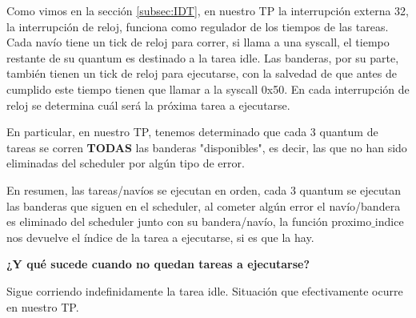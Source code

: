 \par{Como vimos en la sección \ref{subsec:IDT}, en nuestro TP la interrupción externa 32, la interrupción de reloj, funciona como regulador de los tiempos de las tareas. Cada navío tiene un tick de reloj para correr, si llama a una syscall, el tiempo restante de su quantum es destinado a la tarea idle. Las banderas, por su parte, también tienen un tick de reloj para ejecutarse, con la salvedad de que antes de cumplido este tiempo tienen que llamar a la syscall 0x50. En cada interrupción de reloj se determina cuál será la próxima tarea a ejecutarse.}
\par{En particular, en nuestro TP, tenemos determinado que cada 3 quantum de tareas se corren \textbf{TODAS} las banderas "disponibles", es decir, las que no han sido eliminadas del scheduler por algún tipo de error.}
\par{En resumen, las tareas/navíos se ejecutan en orden, cada 3 quantum se ejecutan las banderas que siguen en el scheduler, al cometer algún error el navío/bandera es eliminado del scheduler junto con su bandera/navío, la función proximo$\_$indice nos devuelve el índice de la tarea a ejecutarse, si es que la hay.} 
\medskip
\par{\textbf{¿Y qué sucede cuando no quedan tareas a ejecutarse?}}
\par{Sigue corriendo indefinidamente la tarea idle. Situación que efectivamente ocurre en nuestro TP.}